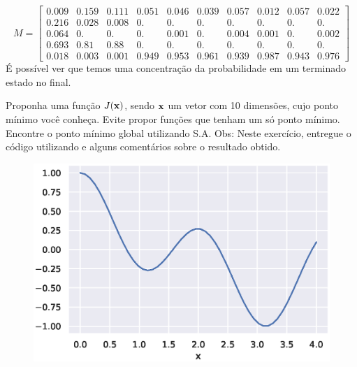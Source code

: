 \documentclass{homeworkclass}
\begin{document}
\begin{homeworkProblem}
\begin{homeworkSection}
\begin{equation*}
M = \begin{bmatrix}
0.009 & 0.159 & 0.111 & 0.051 & 0.046 & 0.039 & 0.057 & 0.012 & 0.057 &
0.022 \\
0.216 & 0.028 & 0.008 & 0.    & 0.    & 0.    & 0.    & 0.    & 0.    &
0.   \\
0.064 & 0.    & 0.    & 0.    & 0.001 & 0.    & 0.004 & 0.001 & 0.    &
0.002 \\
0.693 & 0.81  & 0.88  & 0.    & 0.    & 0.    & 0.    & 0.    & 0.    &
0.   \\
0.018 & 0.003 & 0.001 & 0.949 & 0.953 & 0.961 & 0.939 & 0.987 & 0.943 & 0.976
\end{bmatrix}
\end{equation*}
É possível ver que temos uma concentração da probabilidade em um terminado estado no final.

\end{homeworkSection}



\end{homeworkProblem}

\begin{homeworkProblem}
Proponha uma função $J(\mathbf{x})$, sendo $\mathbf{x}$ um vetor com 10 dimensões, cujo ponto mínimo você conheça. Evite propor funções que tenham um só ponto mínimo. Encontre o ponto mínimo global utilizando S.A. Obs: Neste exercício, entregue o código utilizando e alguns comentários sobre o resultado obtido.
\end{homeworkProblem}

\begin{figure}[!h]
	\centering
	\includegraphics[width=0.7\linewidth]{figs/cos}
\end{figure}
\end{document}
